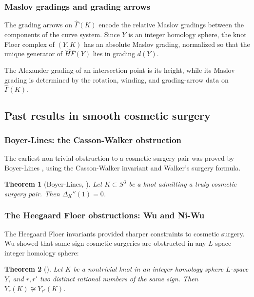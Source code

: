 \documentclass[12pt]{amsart}
\newtheorem{theorem}{Theorem}[section]
\theoremstyle{definition}
\theoremstyle{definition}
\newcommand{\Gh}{\widehat{\Gamma}}
\begin{document}
 \subsubsection*{Maslov gradings and grading arrows}

The grading arrows on $\Gh(K)$ encode the relative Maslov gradings between the
components of the curve system. Since $Y$ is an integer homology sphere, the
knot Floer complex of $(Y,K)$ has an absolute Maslov grading, normalized so that
the unique generator of $\widehat{HF}(Y)$ lies in grading $d(Y)$.

The Alexander grading of an intersection point is its height, while its Maslov
grading is determined by the rotation, winding, and grading-arrow data on
$\Gh(K)$.


\subsection{Past results in smooth cosmetic surgery}

\subsubsection*{Boyer-Lines: the Casson-Walker obstruction}

The earliest non-trivial obstruction to a cosmetic surgery pair was proved by Boyer-Lines \cite{BoyerLines}, using the Casson-Walker invariant and Walker's surgery formula.
 
\begin{theorem}[Boyer-Lines, \cite{BoyerLines}]\label{thm:BL}
Let $K \subset S^3$ be a knot admitting a truly cosmetic surgery pair.
Then $\Delta_K''(1) = 0$.
\end{theorem}

\subsubsection*{The Heegaard Floer obstructions: Wu and Ni-Wu}
The Heegaard Floer invariants provided sharper constraints to cosmetic surgery.
Wu \cite{Wu} showed that same-sign cosmetic surgeries are obstructed
in any $L$-space integer homology sphere:
 
\begin{theorem}[{\cite{Wu}}]\label{thm:Wu}
Let $K$ be a nontrivial knot in an integer homology sphere $L$-space   $Y$,
and $r, r'$ two distinct rational numbers of the same sign. Then
$Y_r(K) \not\cong Y_{r'}(K)$.
\end{theorem}
 
\end{document}

